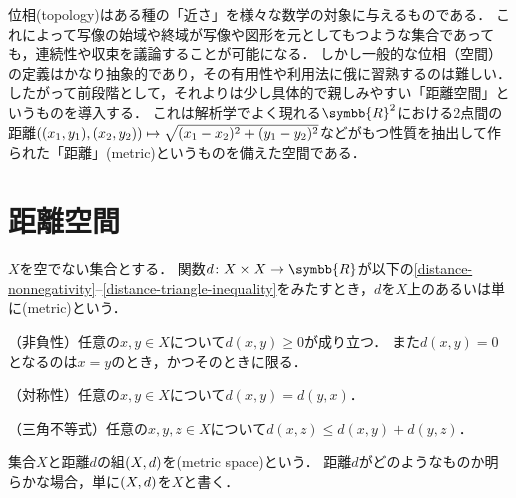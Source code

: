 \documentclass{ltjsbook}
\begin{document}
\nocite{uchida}
\nocite{introduction-to-topology}


位相(topology)はある種の「近さ」を様々な数学の対象に与えるものである．
これによって写像の始域や終域が写像や図形を元としてもつような集合であっても，連続性や収束を議論することが可能になる．
しかし一般的な位相（空間）の定義はかなり抽象的であり，その有用性や利用法に俄に習熟するのは難しい．
したがって前段階として，それよりは少し具体的で親しみやすい「距離空間」というものを導入する．
これは解析学でよく現れる\(\symbb{R}^2\)における2点間の距離\(((x_1, y_1), (x_2, y_2)) \mapsto \sqrt{(x_1 - x_2)^2 + (y_1 - y_2)^2}\)などがもつ性質を抽出して作られた「距離」(metric)というものを備えた空間である．

\section{距離空間}
\begin{thmbox}
\begin{definition}
\(X\)を空でない集合とする．
関数\(d\colon X \times X \to \symbb{R}\)が以下の\ref{distance-nonnegativity}--\ref{distance-triangle-inequality}をみたすとき，\(d\)を\(X\)上のあるいは単に(metric)という．
\begin{conditions}
    \item\label{distance-nonnegativity} （非負性）任意の\(x, y \in X\)について\(d(x, y) \geq 0\)が成り立つ．
        また\(d(x, y) = 0\)となるのは\(x = y\)のとき，かつそのときに限る．
    \item\label{distance-symmetry} （対称性）任意の\(x, y \in X\)について\(d(x, y) = d(y, x)\)．
    \item\label{distance-triangle-inequality} （三角不等式）任意の\(x, y, z \in X\)について\(d(x, z) \leq d(x, y) + d(y, z)\)．
\end{conditions}
集合\(X\)と距離\(d\)の組\((X, d)\)を(metric space)という．
距離\(d\)がどのようなものか明らかな場合，単に\((X, d)\)を\(X\)と書く．
\end{definition}
\end{thmbox}
\end{document}
